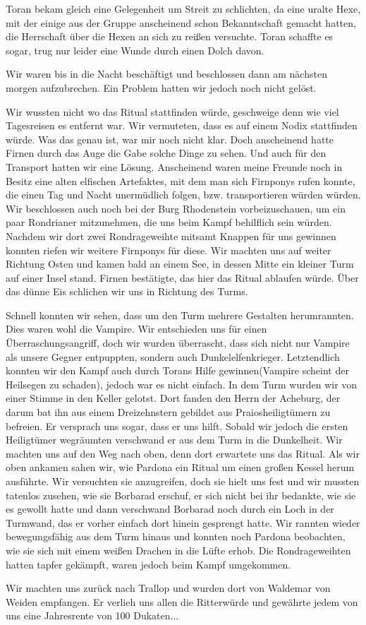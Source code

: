 \documentclass[11pt]{scrreprt}
\begin{document}
Toran bekam gleich eine Gelegenheit um Streit zu schlichten, da eine uralte Hexe, mit der einige aus der Gruppe anscheinend schon Bekanntschaft gemacht hatten, die Herrschaft über die Hexen an sich zu reißen versuchte. Toran schaffte es sogar, trug nur leider eine Wunde durch einen Dolch davon.\par
Wir waren bis in die Nacht beschäftigt und beschlossen dann am nächsten morgen aufzubrechen. Ein Problem hatten wir jedoch noch nicht gelöst.\par
Wir wussten nicht wo das Ritual stattfinden würde, geschweige denn wie viel Tagesreisen es entfernt war. Wir vermuteten, dass es auf einem Nodix stattfinden würde. Was das genau ist, war mir noch nicht klar. Doch anscheinend hatte Firnen durch das Auge die Gabe solche Dinge zu sehen. Und auch für den Transport hatten wir eine Lösung. Anscheinend waren meine Freunde noch in Besitz eine alten elfischen Artefaktes, mit dem man sich Firnponys rufen konnte, die einen Tag und Nacht unermüdlich folgen, bzw. transportieren würden würden. Wir beschlossen auch noch bei der Burg Rhodenstein vorbeizuschauen, um ein paar Rondrianer mitzunehmen, die uns beim Kampf behilflich sein würden. Nachdem wir dort zwei Rondrageweihte mitsamt Knappen für uns gewinnen konnten riefen wir weitere Firnponys für diese. Wir machten uns auf weiter Richtung Osten und kamen bald an einem See, in dessen Mitte ein kleiner Turm auf einer Insel stand. Firnen bestätigte, das hier das Ritual ablaufen würde. Über das dünne Eis schlichen wir uns in Richtung des Turms. \par

Schnell konnten wir sehen, dass um den Turm mehrere Gestalten herumrannten. Dies waren wohl die Vampire. Wir entschieden uns für einen Überraschungsangriff, doch wir wurden überrascht, dass sich nicht nur Vampire als unsere Gegner entpuppten, sondern auch Dunkelelfenkrieger. Letztendlich konnten wir den Kampf auch durch Torans Hilfe gewinnen(Vampire scheint der Heilsegen zu schaden), jedoch war es nicht einfach. In dem Turm wurden wir von einer Stimme in den Keller gelotst. Dort fanden den Herrn der Acheburg, der darum bat ihn aus einem Dreizehnstern gebildet aus Praiosheiligtümern zu befreien. Er versprach uns sogar, dass er uns hilft. Sobald wir jedoch die ersten Heiligtümer wegräumten verschwand er aus dem Turm in die Dunkelheit. Wir machten uns auf den Weg nach oben, denn dort erwartete uns das Ritual. Als wir oben ankamen sahen wir, wie Pardona ein Ritual um einen großen Kessel herum ausführte. Wir versuchten sie anzugreifen, doch sie hielt uns fest und wir mussten tatenlos zusehen, wie sie Borbarad erschuf, er sich nicht bei ihr bedankte, wie sie es gewollt hatte und dann verschwand Borbarad noch durch ein Loch in der Turmwand, das er vorher einfach dort hinein gesprengt hatte. Wir rannten wieder bewegungsfähig aus dem Turm hinaus und konnten noch Pardona beobachten, wie sie sich mit einem weißen Drachen in die Lüfte erhob. Die Rondrageweihten hatten tapfer gekämpft, waren jedoch beim Kampf umgekommen.\par
Wir machten uns zurück nach Trallop und wurden dort von Waldemar von Weiden empfangen. Er verlieh uns allen die Ritterwürde und gewährte jedem von uns eine Jahresrente von 100 Dukaten... 
\end{document}
